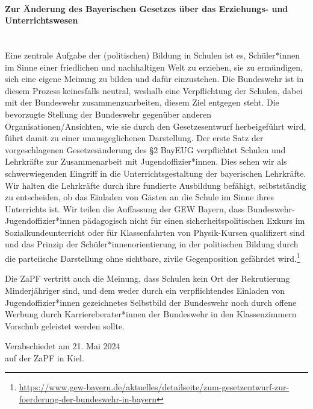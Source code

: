 \documentclass[DIV=calc]{scrartcl}
\begin{document}
\paragraph{Zur Änderung des Bayerischen Gesetzes über das Erziehungs- und Unterrichtswesen} \mbox{}\\
Eine zentrale Aufgabe der (politischen) Bildung in Schulen ist es, Schüler*innen im Sinne einer friedlichen und nachhaltigen Welt zu erziehen, sie zu ermündigen, sich eine eigene Meinung zu bilden und dafür einzustehen. Die Bundeswehr ist in diesem Prozess keinesfalls neutral, weshalb eine Verpflichtung der Schulen, dabei mit der Bundeswehr zusammenzuarbeiten, diesem Ziel entgegen steht. Die bevorzugte Stellung der Bundeswehr gegenüber anderen Organisationen/Ansichten, wie sie durch den Gesetzesentwurf herbeigeführt wird, führt damit zu einer unausgeglichenen Darstellung.
Der erste Satz der vorgeschlagenen Gesetzesänderung des §2 BayEUG verpflichtet Schulen und Lehrkräfte zur Zusammenarbeit mit Jugendoffizier*innen. Dies sehen wir als schwerwiegenden Eingriff in die Unterrichtsgestaltung der bayerischen Lehrkräfte. Wir halten die Lehrkräfte durch ihre fundierte Ausbildung befähigt, selbstständig zu entscheiden, ob das Einladen von Gästen an die Schule im Sinne ihres Unterrichts ist. Wir teilen die Auffassung der GEW Bayern, dass Bundeswehr-Jugendoffizier*innen pädagogisch nicht für einen sicherheitspolitischen Exkurs im Sozialkundeunterricht oder für Klassenfahrten von Physik-Kursen qualifizert sind und das Prinzip der Schüler*innenorientierung in der politischen Bildung durch die parteiische Darstellung ohne sichtbare, zivile Gegenposition gefährdet wird.\footnote{\url{https://www.gew-bayern.de/aktuelles/detailseite/zum-gesetzentwurf-zur-foerderung-der-bundeswehr-in-bayern}}

Die ZaPF vertritt auch die Meinung, dass Schulen kein Ort der Rekrutierung Minderjähriger sind, und dem weder durch ein verpflichtendes Einladen von Jugendoffizier*innen gezeichnetes Selbstbild der Bundeswehr noch durch offene Werbung durch Karriereberater*innen der Bundeswehr in den Klassenzimmern Vorschub geleistet werden sollte.
 

%
\vfill
\begin{flushright}
	Verabschiedet am 21. Mai 2024 \\
	auf der ZaPF in Kiel.
\end{flushright}
\end{document}
